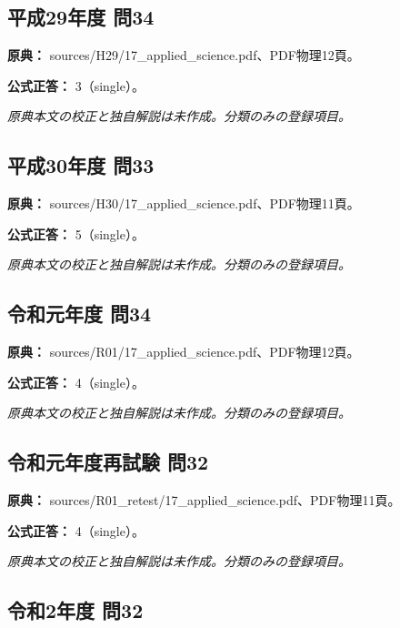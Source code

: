 \subsection{平成29年度 問34}
\label{q:h29-reg-applied-34}

\noindent\textbf{原典：} sources/H29/17\_applied\_science.pdf、PDF物理12頁。

\textbf{公式正答：} 3（single）。

\par\textit{原典本文の校正と独自解説は未作成。分類のみの登録項目。}

\subsection{平成30年度 問33}
\label{q:h30-reg-applied-33}

\noindent\textbf{原典：} sources/H30/17\_applied\_science.pdf、PDF物理11頁。

\textbf{公式正答：} 5（single）。

\par\textit{原典本文の校正と独自解説は未作成。分類のみの登録項目。}

\subsection{令和元年度 問34}
\label{q:r01-reg-applied-34}

\noindent\textbf{原典：} sources/R01/17\_applied\_science.pdf、PDF物理12頁。

\textbf{公式正答：} 4（single）。

\par\textit{原典本文の校正と独自解説は未作成。分類のみの登録項目。}

\subsection{令和元年度再試験 問32}
\label{q:r01-ret-applied-32}

\noindent\textbf{原典：} sources/R01\_retest/17\_applied\_science.pdf、PDF物理11頁。

\textbf{公式正答：} 4（single）。

\par\textit{原典本文の校正と独自解説は未作成。分類のみの登録項目。}

\subsection{令和2年度 問32}
\label{q:r02-reg-applied-32}

